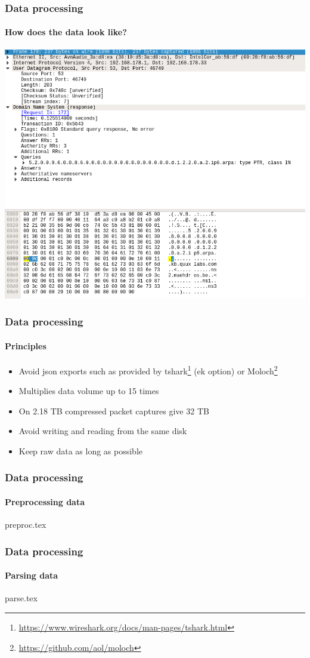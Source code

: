 \documentclass{beamer}
\begin{document}
\begin{frame}
\frametitle{Data processing}
\framesubtitle{How does the data look like?}
\begin{center}
    \includegraphics[scale=0.3]{ws.png}
\end{center}
\end{frame}

\begin{frame}
\frametitle{Data processing}
\framesubtitle{Principles}
    \begin{itemize}
        \item Avoid json exports such as provided by tshark\footnote{\url{https://www.wireshark.org/docs/man-pages/tshark.html}} (ek option) or Moloch\footnote{\url{https://github.com/aol/moloch}}
        \item Multiplies data volume up to 15 times
        \item On 2.18 TB compressed packet captures give 32 TB
        \item Avoid writing and reading from the same disk
        \item Keep raw data as long as possible
    \end{itemize}
\end{frame}

\begin{frame}
    \frametitle{Data processing}
    \framesubtitle{Preprocessing data}
     {preproc.tex}
\end{frame}

\begin{frame}
    \frametitle{Data processing}
    \framesubtitle{Parsing data}
     {parse.tex}
\end{frame}
\end{document}
